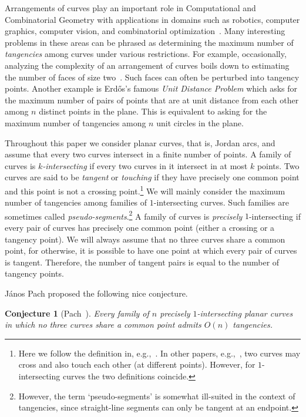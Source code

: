 \documentclass[11pt]{article}
\newtheorem{conjecture}{Conjecture}
\theoremstyle{definition}
\begin{document}
Arrangements of curves play an important role in Computational and Combinatorial Geometry with applications in domains such as robotics,
computer graphics, computer vision, and combinatorial optimization~\cite{PachSharir2009_CGAA}.
Many interesting problems in these areas can be phrased as
determining the maximum number of \emph{tangencies} among curves under various restrictions.
For example, occasionally, analyzing the complexity of an arrangement of curves boils down to estimating the number of faces of size two~\cite{lenses}.
Such faces can often be perturbed into tangency points.
Another example is Erd\H{o}s's famous \emph{Unit Distance Problem} which asks for the maximum number of pairs of points that are at unit distance from each other among $n$ distinct points in the plane. 
This is equivalent to asking for the maximum number of tangencies among $n$ unit circles in the plane.

Throughout this paper we consider planar curves, that is, Jordan arcs,
and assume that every two curves intersect in a finite number of points. %
A family of curves is \emph{$k$-intersecting} if every two curves in it intersect in at most $k$ points.
Two curves are said to be \emph{tangent} or \emph{touching} if they have precisely one common point and this point is not a crossing point.\footnote{Here we follow the definition in, e.g.,~\cite{PRT18}. In other papers, e.g.,~\cite{Ellenberg2016New}, two curves may cross and also touch each other (at different points). However, for $1$-intersecting curves the two definitions coincide.}
We will mainly consider the maximum number of tangencies among families of $1$-intersecting curves. 
Such families are sometimes called \emph{pseudo-segments}.\footnote{However, the term `pseudo-segments' is somewhat ill-suited in the context of tangencies, since straight-line segments can only be tangent at an endpoint.}
A family of curves is \emph{precisely} $1$-intersecting if every pair of curves has precisely one common point (either a crossing or a tangency point).
We will always assume that no three curves share a common point, for otherwise, it is possible to have one point at which every pair of curves is tangent.
Therefore, the number of tangent pairs is equal to the number of tangency points.

J\'anos Pach proposed the following nice conjecture.
\begin{conjecture}[Pach~\cite{pachpc}]\label{conj:precisely-1}
	Every family of $n$ precisely $1$-intersecting planar curves in which no three curves share a common point admits $O(n)$ tangencies.
\end{conjecture}
\end{document}
